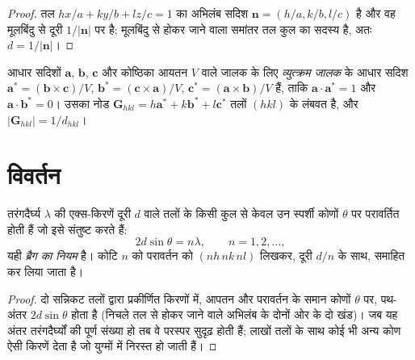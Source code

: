 \begin{proof}
तल $hx/a + ky/b + lz/c = 1$ का अभिलंब सदिश $\mathbf n = (h/a, k/b, l/c)$ है
और वह मूलबिंदु से दूरी $1/|\mathbf n|$ पर है; मूलबिंदु से होकर जाने वाला समांतर तल
कुल का सदस्य है, अतः $d = 1/|\mathbf n|$।
\end{proof}

\begin{definition}[व्युत्क्रम जालक]\label{def:b3:x-ray-diffraction:reciprocal}
आधार सदिशों $\mathbf a$, $\mathbf b$, $\mathbf c$ और कोष्ठिका आयतन $V$ वाले जालक के लिए
\emph{व्युत्क्रम जालक} के आधार सदिश
$\mathbf a^* = (\mathbf b\times\mathbf c)/V$, $\mathbf b^* = (\mathbf c\times\mathbf a)/V$,
$\mathbf c^* = (\mathbf a\times\mathbf b)/V$ हैं, ताकि $\mathbf a\cdot\mathbf a^* = 1$ और
$\mathbf a\cdot\mathbf b^* = 0$। उसका नोड $\mathbf G_{hkl} = h\mathbf a^* + k\mathbf b^* + l\mathbf c^*$
तलों $(hkl)$ के लंबवत है, और $|\mathbf G_{hkl}| = 1/d_{hkl}$।
\end{definition}

\section{विवर्तन}

\begin{theorem}[ब्रैग का नियम]\label{thm:b3:x-ray-diffraction:bragg}
तरंगदैर्घ्य $\lambda$ की एक्स-किरणें दूरी $d$ वाले तलों के किसी कुल से
केवल उन स्पर्शी कोणों $\theta$ पर परावर्तित होती हैं जो इसे संतुष्ट करते हैं:
\[
2d\sin\theta = n\lambda, \qquad n = 1, 2, \dots,
\]
यही \emph{ब्रैग का नियम} है। कोटि $n$ को परावर्तन को
$(nh\,nk\,nl)$ लिखकर, दूरी $d/n$ के साथ, समाहित कर लिया जाता है।
\end{theorem}

\begin{proof}
दो सन्निकट तलों द्वारा प्रकीर्णित किरणों में, आपतन और परावर्तन के समान कोणों
$\theta$ पर, पथ-अंतर $2d\sin\theta$ होता है (निचले तल से होकर जाने वाले अभिलंब के
दोनों ओर के दो खंड)। जब यह अंतर तरंगदैर्घ्यों की पूर्ण संख्या हो तब वे परस्पर
सुदृढ़ होती हैं; लाखों तलों के साथ कोई भी अन्य कोण ऐसी किरणें देता है
जो युग्मों में निरस्त हो जाती हैं।
\end{proof}

